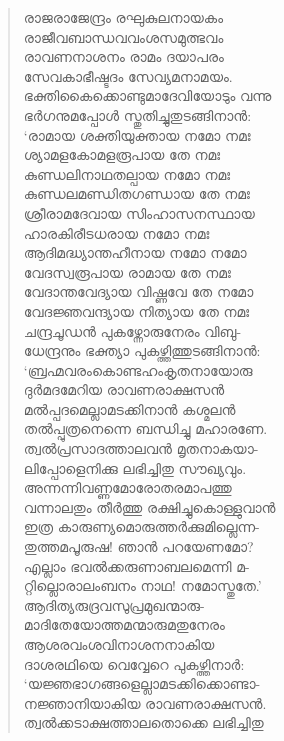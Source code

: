 \begin{verse}
രാജരാജേന്ദ്രം രഘുകുലനായകം\\
രാജീവബാന്ധവവംശസമുത്ഭവം\\
രാവണനാശനം രാമം ദയാപരം\\
സേവകാഭീഷ്ടദം സേവ്യമനാമയം.\\
ഭക്തികൈക്കൊണ്ടുമാദേവിയോടും വന്നു\\
ഭര്‍ഗനുമപ്പോള്‍ സ്തുതിച്ചുതുടങ്ങിനാന്‍:\\
‘രാമായ ശക്തിയുക്തായ നമോ നമഃ\\
ശ്യാമളകോമളരൂപായ തേ നമഃ\\
കുണ്ഡലിനാഥതല്പായ നമോ നമഃ\\
കുണ്ഡലമണ്ഡിതഗണ്ഡായ തേ നമഃ\\
ശ്രീരാമദേവായ സിംഹാസനസ്ഥായ\\
ഹാരകിരീടധരായ നമോ നമഃ\\
ആദിമദ്ധ്യാന്തഹീനായ നമോ നമോ\\
വേദസ്വരൂപായ രാമായ തേ നമഃ\\
വേദാന്തവേദ്യായ വിഷ്ണവേ തേ നമോ\\
വേദജ്ഞവന്ദ്യായ നിത്യായ തേ നമഃ\\
ചന്ദ്രചൂഡന്‍ പുകഴ്ന്നോരുനേരം വിബു-\\
ധേന്ദ്രനും ഭക്ത്യാ പുകഴ്ത്തിത്തുടങ്ങിനാന്‍:\\
‘ബ്രഹ്മവരംകൊണ്ടഹംകൃതനായോരു\\
ദുര്‍മദമേറിയ രാവണരാക്ഷസന്‍\\
മല്‍പ്പദമെല്ലാമടക്കിനാന്‍ കശ്മലന്‍\\
തല്‍പ്പുത്രനെന്നെ ബന്ധിച്ചു മഹാരണേ.\\
ത്വല്‍പ്രസാദത്താലവന്‍ മൃതനാകയാ-\\
ലിപ്പോളെനിക്കു ലഭിച്ചിതു സൗഖ്യവും.\\
അന്നന്നിവണ്ണമോരോതരമാപത്തു\\
വന്നാലതും തീര്‍ത്തു രക്ഷിച്ചുകൊള്ളുവാന്‍\\
ഇത്ര കാരുണ്യമൊരുത്തര്‍ക്കുമില്ലെന്ന-\\
തുത്തമപൂരുഷ! ഞാന്‍ പറയേണമോ?\\
എല്ലാം ഭവല്‍ക്കരുണാബലമെന്നി മ-\\
റ്റില്ലൊരാലംബനം നാഥ! നമോസ്തുതേ.’\\
ആദിത്യരുദ്രവസുപ്രമുഖന്മാരു-\\
മാദിതേയോത്തമന്മാരുമതുനേരം\\
ആശരവംശവിനാശനനാകിയ\\
ദാശരഥിയെ വെവ്വേറെ പുകഴ്ത്തിനാര്‍:\\
‘യജ്ഞഭാഗങ്ങളെല്ലാമടക്കിക്കൊണ്ടാ-\\
നജ്ഞാനിയാകിയ രാവണരാക്ഷസന്‍.\\
ത്വല്‍ക്കടാക്ഷത്താലതൊക്കെ ലഭിച്ചിതു\\

\end{verse}
